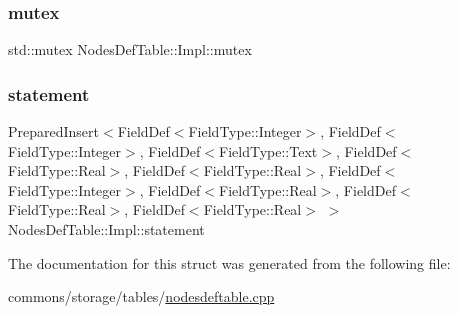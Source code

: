 \subsubsection{\texorpdfstring{mutex}{mutex}}
{\footnotesize\ttfamily std\+::mutex Nodes\+Def\+Table\+::\+Impl\+::mutex}

\mbox{\label{struct_nodes_def_table_1_1_impl_aeb92bf96aab16b8af80ae1ad1c72515e}} 
\subsubsection{\texorpdfstring{statement}{statement}}
{\footnotesize\ttfamily Prepared\+Insert$<$Field\+Def$<$Field\+Type\+::\+Integer$>$, Field\+Def$<$Field\+Type\+::\+Integer$>$, Field\+Def$<$Field\+Type\+::\+Text$>$, Field\+Def$<$Field\+Type\+::\+Real$>$, Field\+Def$<$Field\+Type\+::\+Real$>$, Field\+Def$<$Field\+Type\+::\+Integer$>$, Field\+Def$<$Field\+Type\+::\+Real$>$, Field\+Def$<$Field\+Type\+::\+Real$>$, Field\+Def$<$Field\+Type\+::\+Real$>$ $>$ Nodes\+Def\+Table\+::\+Impl\+::statement}



The documentation for this struct was generated from the following file\+:\begin{DoxyCompactItemize}
\item 
commons/storage/tables/\mbox{\hyperlink{nodesdeftable_8cpp}{nodesdeftable.\+cpp}}\end{DoxyCompactItemize}
